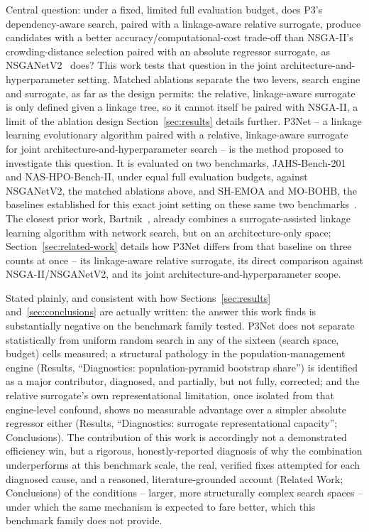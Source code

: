 Central question: under a fixed, limited full evaluation budget, does P3's dependency-aware search, paired with a linkage-aware relative surrogate, produce candidates with a better accuracy/computational-cost trade-off than NSGA-II's crowding-distance selection paired with an absolute regressor surrogate, as NSGANetV2~\citep{lu2020nsganetv2} does? This work tests that question in the joint architecture-and-hyperparameter setting. Matched ablations separate the two levers, search engine and surrogate, as far as the design permits: the relative, linkage-aware surrogate is only defined given a linkage tree, so it cannot itself be paired with NSGA-II, a limit of the ablation design Section~\ref{sec:results} details further. P3Net -- a linkage learning evolutionary algorithm paired with a relative, linkage-aware surrogate for joint architecture-and-hyperparameter search -- is the method proposed to investigate this question. It is evaluated on two benchmarks, JAHS-Bench-201 and NAS-HPO-Bench-II, under equal full evaluation budgets, against NSGANetV2, the matched ablations above, and SH-EMOA and MO-BOHB, the baselines established for this exact joint setting on these same two benchmarks~\citep{guerreroviu2021bagofbaselines}. The closest prior work, Bartnik~\citep{bartnik2026evolutionary}, already combines a surrogate-assisted linkage learning algorithm with network search, but on an architecture-only space; Section~\ref{sec:related-work} details how P3Net differs from that baseline on three counts at once -- its linkage-aware relative surrogate, its direct comparison against NSGA-II/NSGANetV2, and its joint architecture-and-hyperparameter scope.

Stated plainly, and consistent with how Sections~\ref{sec:results} and~\ref{sec:conclusions} are actually written: the answer this work finds is substantially negative on the benchmark family tested. P3Net does not separate statistically from uniform random search in any of the sixteen (search space, budget) cells measured; a structural pathology in the population-management engine (Results, ``Diagnostics: population-pyramid bootstrap share'') is identified as a major contributor, diagnosed, and partially, but not fully, corrected; and the relative surrogate's own representational limitation, once isolated from that engine-level confound, shows no measurable advantage over a simpler absolute regressor either (Results, ``Diagnostics: surrogate representational capacity''; Conclusions). The contribution of this work is accordingly not a demonstrated efficiency win, but a rigorous, honestly-reported diagnosis of why the combination underperforms at this benchmark scale, the real, verified fixes attempted for each diagnosed cause, and a reasoned, literature-grounded account (Related Work; Conclusions) of the conditions -- larger, more structurally complex search spaces -- under which the same mechanism is expected to fare better, which this benchmark family does not provide.
